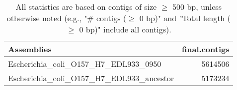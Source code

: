 \documentclass[12pt,a4paper]{article}
\begin{document}
\begin{table}[ht]
\begin{center}
\caption{All statistics are based on contigs of size $\geq$ 500 bp, unless otherwise noted (e.g., "\# contigs ($\geq$ 0 bp)" and "Total length ($\geq$ 0 bp)" include all contigs).}
\begin{tabular}{|l*{1}{|r}|}
\hline
Assemblies & final.contigs \\ \hline
Escherichia\_coli\_O157\_H7\_EDL933\_0950 & 5614506 \\ \hline
Escherichia\_coli\_O157\_H7\_EDL933\_ancestor & 5173234 \\ \hline
\end{tabular}
\end{center}
\end{table}
\end{document}
